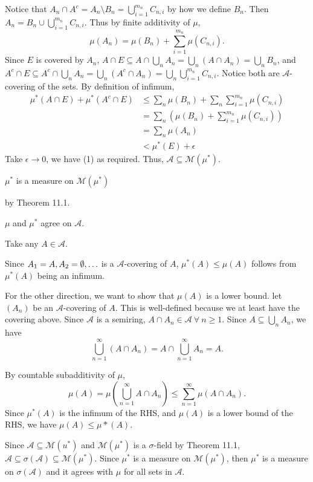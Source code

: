 \documentclass[class=article,crop=false]{standalone}
\begin{document}
\begin{prf}
\begin{case}[]
Notice that $ A_n \cap A^{c} = A_n \setminus B_n = \bigcup_{ i= 1}^{m_n} C_{n,i} $ by how we define $ B_n$. Then $ A_n = B_n \cup \bigcup_{ i= 1}^{m_n} C_{n,i} $. Thus by finite additivity of $ \mu$,
\[
	\mu(A_n) = \mu(B_n) + \sum_{ i= 1}^{ m_n} \mu(C_{n,i}) 
.\]
Since $ E$ is covered by  $ A_n$, $ A \cap E \subseteq A \cap \bigcup_{ n} A_n = \bigcup_{ n}(A \cap A_n) = \bigcup_{ n} B_n  $, and $ A^{c} \cap E \subseteq A^{c} \cap \bigcup_{ n} A_n = \bigcup_{ n} (A^{c} \cap A_n) = \bigcup_{ n} \bigcup_{ i= 1}^{m_n} C_{n,i}    $. Notice both are $ \mathcal{A}$-covering of the sets. By definition of infimum,
\begin{align*}
	\mu^* (A \cap E) + \mu^* (A^{c} \cap E) &\leq \sum_n \mu (B_n) + \sum_n \sum_{ i= 1}^{ m_n} \mu (C_{n,i}) \\
						&= \sum_n \left( \mu(B_n) + \sum_{ i= 1}^{ m_n} \mu (C_{n,i}) \right) \\
						&= \sum_n \mu(A_n) \\
						&< \mu^* (E) + \epsilon
\end{align*}
Take $ \epsilon \to 0$, we have (1) as required. Thus, $ \mathcal{A} \subseteq  \mathcal{M}(\mu^* )$.
\end{case}

\begin{claim}[]
	$ \mu^* $ is a measure on $ \mathcal{M}(\mu^* )$
\end{claim}
by Theorem 11.1.

\begin{claim}[]
$ \mu$ and $ \mu^* $ agree on $ \mathcal{A}$.
\end{claim}

Take any $ A \in \mathcal{A}$.  

Since $ A_1 = A, A_2 = \emptyset,\ldots$ is a $ \mathcal{A}$-covering of $ A$, $ \mu^* (A) \leq \mu(A)$ follows from $ \mu^* (A)$ being an infimum.

For the other direction, we want to show that $ \mu(A)$ is a lower bound. let $ (A_n)$ be an $ \mathcal{A}$-covering of $ A$. This is well-defined because we at least have the covering above. Since $ \mathcal{A}$ is a semiring, $ A \cap A_n \in \mathcal{A} \ \forall \ n \geq 1$. Since $ A \subseteq \bigcup_n A_n $, we have
\[
	\bigcup_{ n =1}^{\infty} (A \cap A_n) = A \cap \bigcup_{ n =1}^{\infty} A_n = A
.\]

By countable subadditivity of $ \mu$,
\[
	\mu(A) = \mu\left( \bigcup_{ n =1}^{\infty}  A \cap A_n \right) \leq \sum_{ n= 1}^{\infty} \mu(A \cap A_n) 
.\] 
Since $ \mu^* (A)$ is the infimum of the RHS, and $ \mu(A)$ is a lower bound of the RHS, we have $ \mu(A) \leq \mu*(A)$.

Since $ \mathcal{A} \subseteq \mathcal{M}(u^* )$ and $ \mathcal{M}(\mu^* )$ is a $\sigma$-field by Theorem 11.1, $ \mathcal{A} \subseteq \sigma(\mathcal{A}) \subseteq \mathcal{M}(\mu^* )$. Since $ \mu^* $ is a measure on $ \mathcal{M}(\mu^* )$, then $ \mu^* $ is a measure on $ \sigma(\mathcal{A})$ and it agrees with $ \mu$ for all sets in $ \mathcal{A}$.


\end{prf}
\end{document}
